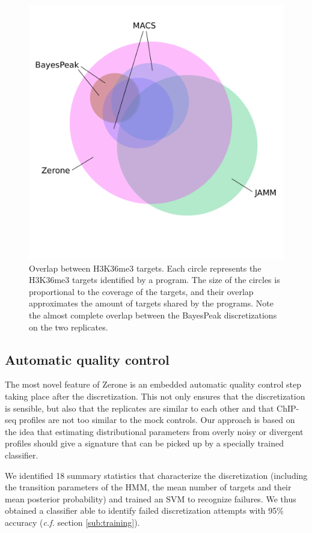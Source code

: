 \documentclass{bioinfo}
\begin{document}
\begin{figure}[!tpb]
\centerline{\includegraphics[scale=0.5]{histone_venn_color_names.pdf}}
\caption{
  Overlap between H3K36me3 targets. Each circle represents the
  H3K36me3 targets identified by a program. The size of the circles
  is proportional to the coverage of the targets, and their overlap
  approximates the amount of targets shared by the programs. Note
  the almost complete overlap between the BayesPeak discretizations
  on the two replicates.
}\label{fig:venn}
\end{figure}

\subsection{Automatic quality control}
The most novel feature of Zerone is an embedded automatic quality
control step taking place after the discretization. This not only
ensures that the discretization is sensible, but also that the
replicates are similar to each other and that ChIP-seq profiles
are not too similar to the mock controls. Our approach is based
on the idea that estimating distributional parameters from
overly noisy or divergent profiles should give a signature that
can be picked up by a specially trained classifier.

We identified 18 summary statistics that characterize the
discretization (including the transition parameters of the HMM,
the mean number of targets and their mean posterior probability)
and trained an SVM to recognize failures. We thus obtained a
classifier able to identify failed discretization attempts
with 95\% accuracy (\textit{c.f.} section \ref{sub:training}).
\end{document}
